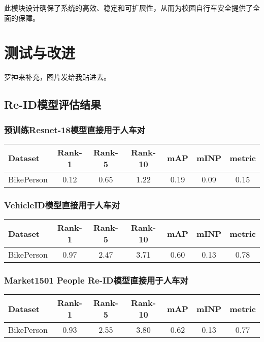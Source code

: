 \documentclass{article}
\begin{document}
此模块设计确保了系统的高效、稳定和可扩展性，从而为校园自行车安全提供了全面的保障。

\section{测试与改进}
罗神来补充，图片发给我贴进去。

\subsection{Re-ID模型评估结果}

\subsubsection{预训练Resnet-18模型直接用于人车对}
\begin{table}[H]
\centering
\begin{tabular}{l|cccccc}
\toprule
Dataset & Rank-1 & Rank-5 & Rank-10 & mAP & mINP & metric \\
\midrule
BikePerson & 0.12 & 0.65 & 1.22 & 0.19 & 0.09 & 0.15 \\
\bottomrule
\end{tabular}
\end{table}

\subsubsection{VehicleID模型直接用于人车对}
\begin{table}[H]
\centering
\begin{tabular}{l|cccccc}
\toprule
Dataset & Rank-1 & Rank-5 & Rank-10 & mAP & mINP & metric \\
\midrule
BikePerson & 0.97 & 2.47 & 3.71 & 0.60 & 0.13 & 0.78 \\
\bottomrule
\end{tabular}
\end{table}

\subsubsection{Market1501 People Re-ID模型直接用于人车对}
\begin{table}[H]
\centering
\begin{tabular}{l|cccccc}
\toprule
Dataset & Rank-1 & Rank-5 & Rank-10 & mAP & mINP & metric \\
\midrule
BikePerson & 0.93 & 2.55 & 3.80 & 0.62 & 0.13 & 0.77 \\
\bottomrule
\end{tabular}
\end{table}
\end{document}
